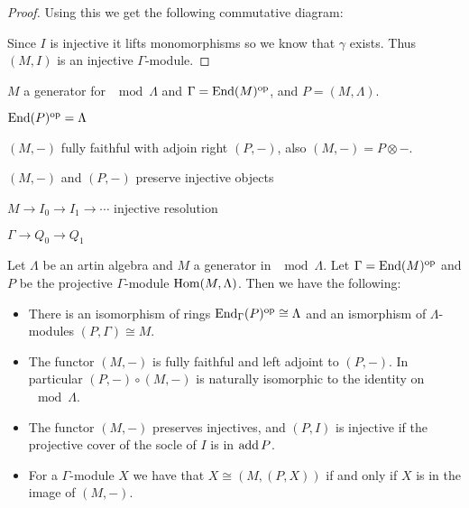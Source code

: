 \begin{prop}
\begin{proof}
		Using this we get the following commutative diagram:
		\begin{center}
		\end{center}
		Since $I$ is injective it lifts monomorphisms so we know that $\gamma$ exists. Thus $(M, I)$ is an injective $\Gamma$-module.
	\end{proof}
\end{prop}

$M$ a generator for $\mod\Lambda$ and $\Gamma = \operatorname{End}(M)^{\operatorname{op}}$, and $P = (M, \Lambda)$.

$\operatorname{End}(P)^{\operatorname{op}} = \Lambda$

$(M, -)$ fully faithful with adjoin right $(P, -)$, also $(M,-) = P\otimes -$.

$(M,-)$ and $(P,-)$ preserve injective objects

$M \to I_0 \to I_1 \to \cdots$ injective resolution

$\Gamma \to Q_0 \to Q_1$


\begin{theorem}\label{thm:wedderburn_equiv}
	Let $\Lambda$ be an artin algebra and $M$ a generator in $\mod\Lambda$. Let $\Gamma = \operatorname{End}(M)^{\operatorname{op}}$ and $P$ be the projective $\Gamma$-module $\operatorname{Hom}(M, \Lambda)$. Then we have the following:
	\begin{itemize}
		\item There is an isomorphism of rings $\operatorname{End}_\Gamma(P)^{\operatorname{op}} \cong \Lambda$ and an ismorphism of $\Lambda$-modules $(P, \Gamma) \cong M$.
		\item The functor $(M, -)$ is fully faithful and left adjoint to $(P,-)$. In particular $(P,-)\circ (M, -)$ is naturally isomorphic to the identity on $\mod\Lambda$.
		\item The functor $(M, -)$ preserves injectives, and $(P,I)$ is injective if the projective cover of the socle of $I$ is in $\operatorname{add} P$.
		\item For a $\Gamma$-module $X$ we have that $X \cong (M, (P, X))$ if and only if $X$ is in the image of $(M,-)$.
	\end{itemize} 
\end{theorem}

